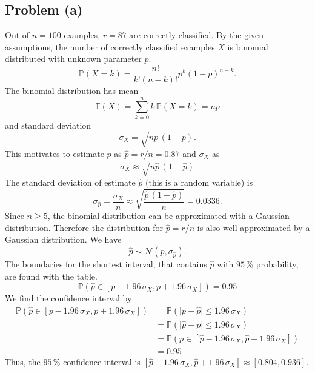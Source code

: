 \subsection*{Problem (a)}

Out of $n=100$ examples, $r=87$ are correctly classified. By the
given assumptions, the number of correctly classified examples $X$
is binomial distributed with unknown parameter $p$.
\[
\mathbb{P}(X=k)=\frac{n!}{k!(n-k)!}p^{k}(1-p)^{n-k}.
\]
The binomial distribution has mean
\[
\mathbb{E}(X)=\sum_{k=0}^{n}k\,\mathbb{P}(X=k)=np
\]
and standard deviation 
\[
\sigma_{X}=\sqrt{np\,(1-p)}.
\]
This motivates to estimate $p$ as $\hat{p}=r/n=0.87$ and $\sigma_{X}$
as 
\[
\sigma_{X}\approx\sqrt{n\hat{p}\,(1-\hat{p})}
\]
 The standard deviation of estimate $\hat{p}$ (this is a random variable)
is
\[
\sigma_{\hat{p}}=\frac{\sigma_{X}}{n}\approx\sqrt{\frac{\hat{p}\,(1-\hat{p})}{n}}=0.0336.
\]
Since $n\geq5$, the binomial distribution can be approximated with
a Gaussian distribution. Therefore the distribution for $\hat{p}=r/n$
is also well approximated by a Gaussian distribution. We have
\[
\hat{p}\sim\mathcal{N}(p,\sigma_{\hat{p}}).
\]
The boundaries for the shortest interval, that contains $\hat{p}$
with $95\,\%$ probability, are found with the table.
\[
\mathbb{P}\left(\hat{p}\in\left[p-1.96\,\sigma_{X},p+1.96\,\sigma_{X}\right]\right)=0.95
\]
We find the confidence interval by 
\begin{align*}
\mathbb{P}\left(\hat{p}\in\left[p-1.96\,\sigma_{X},p+1.96\,\sigma_{X}\right]\right) & =\mathbb{P}\left(\vert p-\hat{p}\vert\leq1.96\,\sigma_{X}\right)\\
 & =\mathbb{P}\left(\vert\hat{p}-p\vert\leq1.96\,\sigma_{X}\right)\\
 & =\mathbb{P}\left(p\in\left[\hat{p}-1.96\,\sigma_{X},\hat{p}+1.96\,\sigma_{X}\right]\right)\\
 & =0.95
\end{align*}
Thus, the $95\,\%$ confidence interval is $\left[\hat{p}-1.96\,\sigma_{X},\hat{p}+1.96\,\sigma_{X}\right]\approx\left[0.804,0.936\right]$.